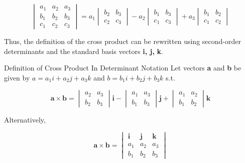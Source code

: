         \[
            \begin{vmatrix}
                a_1 & a_2 & a_3 \\
                b_1 & b_2 & b_3 \\
                c_1 & c_2 & c_3
            \end{vmatrix}
            = a_1
            \begin{vmatrix}
                b_2 & b_3 \\
                c_2 & c_3
            \end{vmatrix}
            - a_2
            \begin{vmatrix}
                b_1 & b_3 \\
                c_1 & c_3
            \end{vmatrix}
            + a_3
            \begin{vmatrix}
                b_1 & b_2 \\
                c_1 & c_2
            \end{vmatrix}
        \]

        Thus, the definition of the cross product can be rewritten using second-order determinants and the standard basis vectors \textbf{i, j,} \textbf{k}.

        \begin{corollemma}{Definition of Cross Product In Determinant Notation}
            Let vectors \textbf{a} and \textbf{b} be given by $a = a_1 i + a_2 j + a_3 k$ and $b = b_1 i + b_2 j + b_3 k$ s.t.

            \[
                \mathbf{a\times b} =
                \begin{vmatrix}
                    a_2 & a_3 \\
                    b_2 & b_3
                \end{vmatrix}
                \mathbf{i} -
                \begin{vmatrix}
                    a_1 & a_3 \\
                    b_1 & b_3
                \end{vmatrix}
                \mathbf{j} +
                \begin{vmatrix}
                    a_1 & a_2 \\
                    b_1 & b_2
                \end{vmatrix}
                \mathbf{k}
            \]

            Alternatively,

            \[
                \mathbf{a\times b} =
                \begin{vmatrix}
                    \mathbf{i} & \mathbf{j} & \mathbf{k} \\
                    a_1         & a_2       & a_3 \\
                    b_1         & b_2       & b_3
                \end{vmatrix}
            \]
        \end{corollemma}

